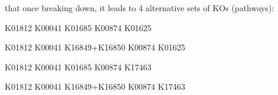 \documentclass[sn-mathphys,Numbered]{sn-jnl}%
\theoremstyle{thmstyleone}%
\theoremstyle{thmstyletwo}%
\theoremstyle{thmstylethree}%
\begin{document}
\begin{appendices}
            
            \begin{flushleft}
                that once breaking down, it leads to 4 alternative sets of KOs (pathways):\vspace{0.25cm}
            \end{flushleft} 

            K01812 K00041 K01685 K00874 K01625\vspace{0.25cm}

            K01812 K00041 K16849+K16850 K00874 K01625\vspace{0.25cm}

            K01812 K00041 K01685 K00874 K17463\vspace{0.25cm}

            K01812 K00041 K16849+K16850 K00874 K17463\vspace{0.5cm}




\end{appendices}


% 
\end{document}
